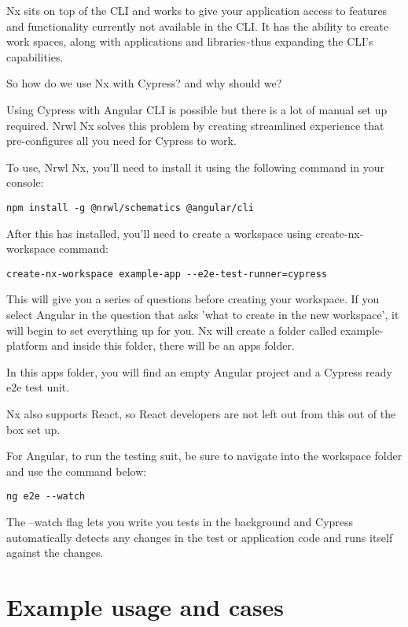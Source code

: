 Nx sits on top of the CLI and works to give your application access to features
and functionality currently not available in the CLI. It has the ability to
create work spaces, along with applications and libraries - thus expanding the
CLI's capabilities.

So how do we use Nx with Cypress? and why should we?

Using Cypress with Angular CLI is possible but there is a lot of manual set up
required. Nrwl Nx solves this problem by creating streamlined experience that
pre-configures all you need for Cypress to work.

To use, Nrwl Nx, you'll need to install it using the following command in your
console:

\begin{verbatim}
npm install -g @nrwl/schematics @angular/cli
\end{verbatim}

After this has installed, you'll need to create a workspace using
create-nx-workspace command:

\begin{verbatim}
create-nx-workspace example-app --e2e-test-runner=cypress
\end{verbatim}

This will give you a series of questions before creating your workspace. If you
select Angular in the question that asks 'what to create in the new workspace',
it will begin to set everything up for you. Nx will create a folder called
example-platform and inside this folder, there will be an apps folder.

In this apps folder, you will find an empty Angular project and a Cypress ready
e2e test unit.

Nx also supports React, so React developers are not left out from this out of
the box set up.

For Angular, to run the testing suit, be sure to navigate into the workspace
folder and use the command below:

\begin{verbatim}
ng e2e --watch
\end{verbatim}

The --watch flag lets you write you tests in the background and Cypress
automatically detects any changes in the test or application code and runs
itself against the changes.

\section{ Example usage and cases }

